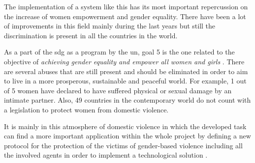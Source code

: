 	The implementation of a system like this has its most important repercussion on the increase of women empowerment and gender equality. There have been a lot of improvements in this field mainly during the last years but still the discrimination is present in all the countries in the world. 
	
	As a part of the \acrfull{sdg} as a program by the \acrfull{un}, goal 5 is the one related to the objective of \textit{achieving gender equality and empower all women and girls} \cite{UnitedNations}. There are several abuses that are still present and should be eliminated in order to aim to live in a more prosperous, sustainable and peaceful world. For example, 1 out of 5 women have declared to have suffered physical or sexual damage by an intimate partner. Also, 49 countries in the contemporary world do not count with a legislation to protect women from domestic violence. 
	
	It is mainly in this atmosphere of domestic violence in which the developed task can find a more important application within the whole project by defining a new protocol for the protection of the victims of gender-based violence including all the involved agents in order to implement a technological solution \cite{UC3M4SafetyTeam2018}.
	

	
	
	
	
	